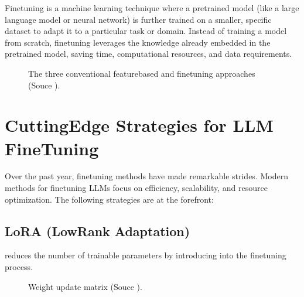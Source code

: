 \documentclass[letterpaper,11pt,english]{sphinxmanual}
\begin{document}
\sphinxAtStartPar
Fine\sphinxhyphen{}tuning is a machine learning technique where a pre\sphinxhyphen{}trained model (like a large
language model or neural network) is further trained on a smaller, specific dataset
to adapt it to a particular task or domain. Instead of training a model from scratch,
fine\sphinxhyphen{}tuning leverages the knowledge already embedded in the pre\sphinxhyphen{}trained model,
saving time, computational resources, and data requirements.

\begin{figure}[htbp]
\centering
\capstart

\noindent{}
\caption{The three conventional feature\sphinxhyphen{}based and finetuning approaches (Souce ).}\label{\detokenize{finetuning:id9}}\label{\detokenize{finetuning:fig-fine-tuning}}\end{figure}


\section{Cutting\sphinxhyphen{}Edge Strategies for LLM Fine\sphinxhyphen{}Tuning}
\label{\detokenize{finetuning:cutting-edge-strategies-for-llm-fine-tuning}}
\sphinxAtStartPar
Over the past year, fine\sphinxhyphen{}tuning methods have made remarkable strides. Modern methods
for fine\sphinxhyphen{}tuning LLMs focus on efficiency, scalability, and resource optimization.
The following strategies are at the forefront:


\subsection{LoRA (Low\sphinxhyphen{}Rank Adaptation)}
\label{\detokenize{finetuning:lora-low-rank-adaptation}}
\sphinxAtStartPar
{} reduces the number of trainable parameters by introducing  into the fine\sphinxhyphen{}tuning process.

\begin{figure}[htbp]
\centering
\capstart

\noindent{}
\caption{Weight update matrix (Souce ).}\label{\detokenize{finetuning:id10}}\label{\detokenize{finetuning:fig-lora}}\end{figure}
\end{document}

